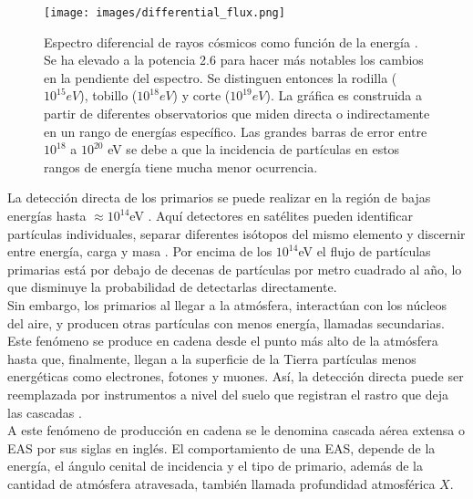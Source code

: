 
    \begin{figure}[htb!]
        \begin{center}
			\texttt{[image: images/differential\_flux.png]}
        \end{center}
       \caption[Espectro diferencial de rayos cósmicos como función de la energía]{Espectro diferencial de rayos cósmicos como función de la energía \cite{mauro:oxigen}. Se ha elevado a la potencia 2.6 para hacer más notables los cambios en la pendiente del espectro. Se distinguen entonces la rodilla ($10^{15}eV$), tobillo ($10^{18}eV$) y corte ($10^{19}eV $). La gráfica es construida a partir de diferentes observatorios que miden directa o indirectamente en un rango de energías específico. Las grandes barras de error entre $10^{18}$ a $10^{20}$ eV se debe a que la incidencia de partículas en estos rangos de energía tiene mucha menor ocurrencia.}
       \label{fig:fig1}
    \end{figure}

La detección directa de los primarios se puede realizar en la región de bajas energías hasta $\approx 10^{14} $eV \cite{mauro:oxigen}. Aquí detectores en satélites pueden identificar partículas individuales, separar diferentes isótopos del mismo elemento y discernir entre energía, carga y masa . Por encima de los $10^{14} $eV el flujo de partículas primarias está por debajo de decenas de partículas por metro cuadrado al año, lo que disminuye la probabilidad de detectarlas directamente.\\

Sin embargo, los primarios al llegar a la atmósfera, interactúan con los núcleos del aire, y producen otras partículas con menos energía, llamadas secundarias. Este fenómeno se produce en cadena desde el punto más alto de la atmósfera hasta que, finalmente, llegan a la superficie de la Tierra partículas menos energéticas como electrones, fotones y muones. Así, la detección directa puede ser reemplazada por instrumentos a nivel del suelo que registran el rastro que deja las cascadas \cite{AsoreyLAGO}.\\ %

A este fenómeno de producción en cadena se le denomina cascada aérea extensa o EAS por sus siglas en inglés. El comportamiento de una EAS, depende de la energía, el ángulo cenital de incidencia y el tipo de primario, además de la cantidad de atmósfera atravesada, también llamada profundidad atmosférica $X$. \\

